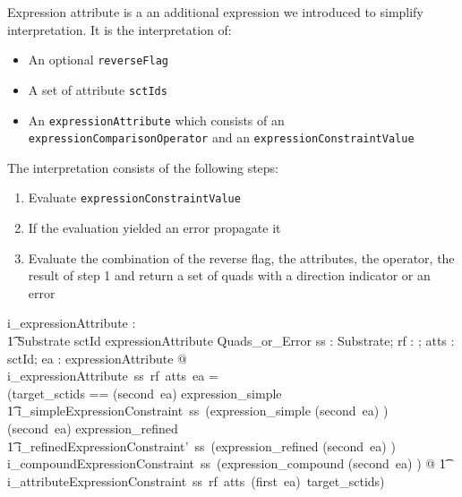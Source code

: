 \documentclass{article}
\def\spec#1{{\tt #1}}
\begin{document}
Expression attribute is a an additional expression we introduced to simplify interpretation.  It is the interpretation of:
\begin{itemize}[noitemsep,nolistsep]
\item An optional \spec{reverseFlag}
\item A set of attribute \spec{sctIds}
\item An \spec{expressionAttribute} which consists of an \spec{expressionComparisonOperator} and an \spec{expressionConstraintValue}
\end{itemize}

The interpretation consists of the following steps:
\begin{enumerate}
\item Evaluate \spec{expressionConstraintValue}
\item If the evaluation yielded an error propagate it
\item Evaluate the combination of the reverse flag, the attributes, the operator, the result of step 1 and return a set of quads with a direction indicator or an error
\end{enumerate}


\begin{gendef}
   i\_expressionAttribute : \\
\t1 Substrate \fun \optional[reverseFlag] \fun \power sctId \fun expressionAttribute \fun Quads\_or\_Error
\where
   \forall ss : Substrate; rf : \optional[reverseFlag]; atts : \power sctId; ea : expressionAttribute @ \\
   i\_expressionAttribute~ss~rf~atts~ea = \\
   (\LET target\_sctids == 
   \IF (second~ea) \in \ran expression\_simple \\
\t1 \THEN i\_simpleExpressionConstraint~ss~(expression\_simple \inv (second~ea) ) \\
\ELSE \IF (second~ea)  \in \ran expression\_refined \\
\t1 \THEN i\_refinedExpressionConstraint'~ss~(expression\_refined \inv (second~ea) ) \\
\ELSE i\_compoundExpressionConstraint~ss~(expression\_compound \inv (second~ea) ) @ 
\also
\t1 i\_attributeExpressionConstraint~ss~rf~atts~(first~ea)~target\_sctids)
\end{gendef}
\end{document}

